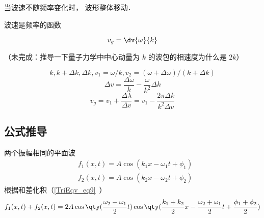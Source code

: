 
\begin{issues}
\issueDraft
\end{issues}


当波速不随频率变化时， 波形整体移动．

波速是频率的函数

\begin{equation}
v_g = \dv{\omega}{k}
\end{equation}

（未完成：推导一下量子力学中中心动量为 $k$ 的波包的相速度为什么是 $2k$）

\begin{equation}
k, k+\Delta k, \Delta k, v_1 = \omega/k, v_2 = (\omega+\Delta\omega)/(k+\Delta k)
\end{equation}
\begin{equation}
\Delta v = \frac{\Delta \omega}{k} - \frac{\omega}{k^2}\Delta k
\end{equation}
\begin{equation}
v_g = v_1 + \frac{\Delta \lambda}{\Delta v} = v_1 - \frac{2\pi\Delta k}{k^2\Delta v}
\end{equation}

\subsection{公式推导}
两个振幅相同的平面波
\begin{equation}
\begin{aligned}
&f_1(x,t) = A\cos(k_1 x - \omega_1 t + \phi_1)\\
&f_2(x,t) = A\cos(k_2 x - \omega_2 t + \phi_2)
\end{aligned}
\end{equation}
根据和差化积（\autoref{TriEqv_eq9}~）
\begin{equation}
\begin{aligned}
f_1(x,t) + f_2(x,t) = 2 A \cos \qty(\frac{\omega_{2}-\omega_{1}}{2} t) \cos \qty(\frac{k_1+k_2}{2}x - \frac{\omega_{2}+\omega_{1}}{2}t + \frac{\phi_1 + \phi_2}{2})
\end{aligned}
\end{equation}
